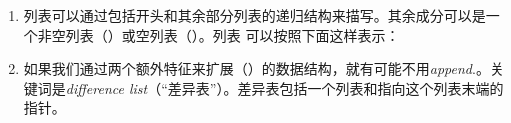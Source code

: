 \begin{enumerate}
\item 列表可以通过包括开头和其余部分列表的递归结构来描写。其余成分可以是一个非空列表（）或空列表（）。列表 可以按照下面这样表示：
\ea
{}
\z
\item 如果我们通过两个额外特征来扩展（）的数据结构，就有可能不用\emph{append}.。关键词是\emph{difference list}（“差异表”）。差异表包括一个列表和指向这个列表末端的指针。
\ea
{}
\z


\end{enumerate}
